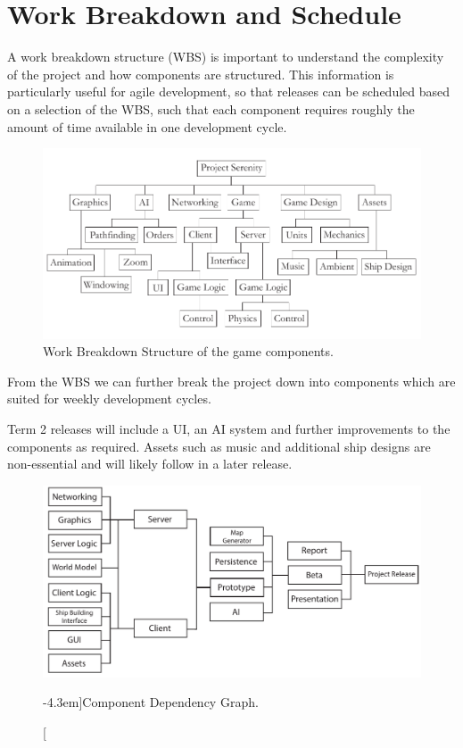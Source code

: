 \section{Work Breakdown and Schedule}
A work breakdown structure (WBS) is important to understand the complexity of the project and how components are structured. This information is particularly useful for agile development, so that releases can be scheduled based on a selection of the WBS,
 such that each component requires roughly the amount of time available in one development cycle.

\begin{figure}[h!]
	\includegraphics{res/wbs}
	\caption{Work Breakdown Structure of the game components.}
\end{figure}

From the WBS we can further break the project down into components which are suited for weekly development cycles.

Term 2 releases will include a UI, an AI system and further improvements to the components as required. Assets such as music and additional ship designs are non-essential and will likely follow in a later release.

\begin{figure}
	\includegraphics{res/dependency_tree}
	\caption[][-4.3em]{Component Dependency Graph.}
\end{figure}


